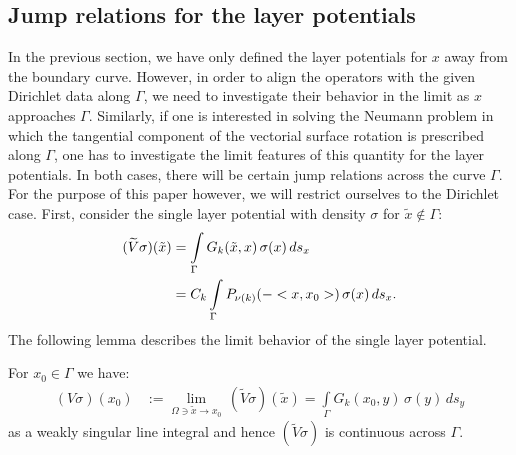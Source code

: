 \documentclass[final]{siamltex}
\begin{document}
\subsection{Jump relations for the layer potentials} 
In the previous section, we have only defined the layer potentials for
$x$ away from the boundary curve. However, in order to align the
operators with the given Dirichlet data along $\Gamma$, we need to
investigate their behavior in the limit as $x$ approaches $\Gamma$.
Similarly, if one is interested in solving the Neumann problem in which
the tangential component of the vectorial surface rotation is
prescribed along $\Gamma$, one has to investigate the limit features of
this quantity for the layer potentials. In both cases, there will be
certain jump relations across the curve $\Gamma$. For the purpose of
this paper however, we will restrict ourselves to the Dirichlet case.
First, consider the single layer potential with density $\sigma$ for
$\tilde{x} \notin \Gamma$:
\begin{align*}
(\widetilde{V}\sigma)(\tilde{x}) & =  \int\limits_\Gamma
G_k(\tilde{x},x)\,\sigma(x)\,ds_{x} \notag\\
& = C_k \int\limits_\Gamma P_{\nu(k)}(-<x,x_{0}>)\,\sigma(x)\,ds_{x}.
\end{align*}
The following lemma describes the limit behavior of the single layer potential.
\begin{lemma}
For $x_0\in\Gamma$ we have:
\begin{align*} 
(V\sigma)(x_0) & := \lim\limits_{\Omega \ni \tilde{x}\to x_0}\,(\widetilde{V}\sigma)(\tilde{x}) = \int\limits_\Gamma G_k(x_0,y)\,\sigma(y)\,ds_{y}
\end{align*}
as a weakly singular line integral and hence $(\widetilde{V}\sigma)$ is continuous across $\Gamma$.
\end{lemma}
\end{document}
